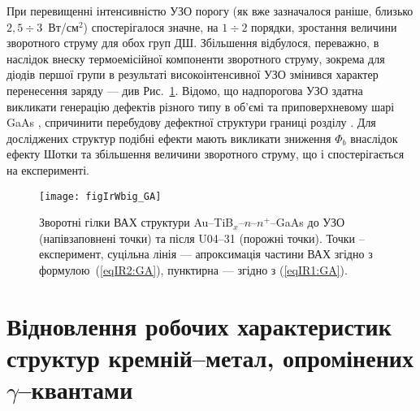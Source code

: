 \documentclass[a4paper,14pt,oneside,openany]{memoir}
\begin{document}
При перевищенні інтенсивністю  УЗО порогу (як вже зазначалося раніше, близько $2,5\div3$~Вт/см$^2$) спостерігалося значне, на $1\div2$ порядки,
зростання величини зворотного струму для обох груп ДШ.
Збільшення відбулося, переважно, в наслідок внеску термоемісійної компоненти зворотного струму, зокрема для діодів першої групи в результаті високоінтенсивної УЗО
змінився характер перенесення заряду --- див Рис.~\ref{figIrWbig_GA}.
Відомо, що надпорогова УЗО здатна викликати генерацію дефектів різного типу в об’ємі та приповерхневому шарі GaAs \cite{Zaver},
спричинити перебудову дефектної структури границі розділу \cite{Parchinskii2003r}.
Для досліджених структур подібні ефекти мають викликати зниження $\Phi_b$ внаслідок ефекту Шотки та збільшення величини зворотного струму, що і спостерігається на експерименті.


\begin{figure}
\center
\texttt{[image: figIrWbig\_GA]}%
\caption{\label{figIrWbig_GA}
Зворотні гілки ВАХ структури Au--TiB$_x$--$n$--$n^+$--GaAs
до УЗО (напівзаповнені точки)
та після U04--31 (порожні точки).
Точки -- експеримент,
суцільна лінія --- апроксимація частини ВАХ згідно з формулою~(\ref{eqIR2:GA}),
пунктирна  --- згідно з (\ref{eqIR1:GA}).
}%
\end{figure}




\section{Відновлення робочих характеристик структур кремній--метал, опромінених $\gamma$--квантами}
\end{document}
